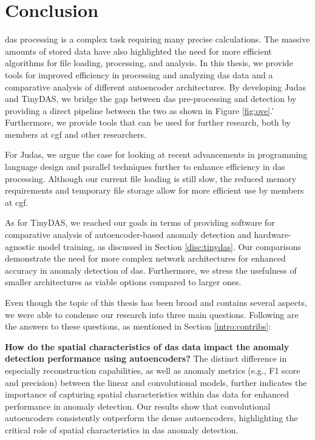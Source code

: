 \section{Conclusion}
\label{conc:conc}

\acrshort{das} processing is a complex task requiring many precise calculations. The massive amounts of stored data have also highlighted the need for more efficient algorithms for file loading, processing, and analysis. In this thesis, we provide tools for improved efficiency in processing and analyzing \acrshort{das} data and a comparative analysis of different autoencoder architectures. By developing
Judas and TinyDAS, we bridge the gap between \acrshort{das} pre-processing and detection by providing a direct pipeline between the two as shown in Figure \ref{fig:ove}.' Furthermore, we provide tools that can be used for further research, both by members at \acrshort{cgf} and other researchers.

For Judas, we argue the case for looking at recent advancements in programming language design and parallel techniques further to enhance efficiency in \acrshort{das} processing. Although our current file loading is still slow, the reduced memory requirements and temporary file storage allow for more efficient use by members at \acrshort{cgf}.

As for TinyDAS, we reached our goals in terms of providing software for comparative analysis of autoencoder-based anomaly detection and hardware-agnostic model training, as discussed in Section \ref{disc:tinydas}. Our comparisons demonstrate the need for more complex network architectures for enhanced accuracy in anomaly detection of \acrshort{das}. Furthermore, we stress the usefulness of smaller architectures as viable options compared to larger ones.

Even though the topic of this thesis has been broad and contains several aspects, we were able to condense our research into three main questions. Following are the answers to these questions, as mentioned in Section \ref{intro:contribs}:

\textbf{How do the spatial characteristics of \acrshort{das} data impact the anomaly detection performance using autoencoders?}
The distinct difference in especially reconstruction capabilities, as well as anomaly metrics (e.g., F1 score and precision) between the linear and convolutional models, further indicates the importance of capturing spatial characteristics within \acrshort{das} data for enhanced performance in anomaly detection. Our results show that convolutional autoencoders consistently outperform the dense autoencoders, highlighting the critical role of spatial characteristics in \acrshort{das} anomaly detection.

